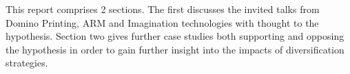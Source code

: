 
This report comprises 2 sections. %
The first discusses the invited talks from Domino Printing, ARM and Imagination technologies with thought to the hypothesis. 
Section two gives further case studies both supporting and opposing the hypothesis in order to gain further insight into the impacts of diversification strategies.






